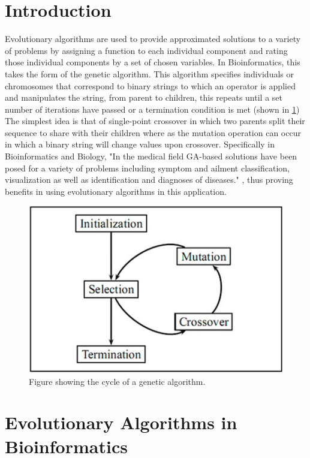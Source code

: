 \documentclass[12pt]{article}
\begin{document}
\section{Introduction}
\label{Introduction Section}
Evolutionary algorithms are used to provide approximated solutions to a variety of problems by assigning a function to each individual component and rating those individual components by a set of chosen variables. In Bioinformatics, this takes the form of the genetic algorithm. This algorithm specifies individuals or chromosomes that correspond to binary strings to which an operator is applied and manipulates the string, from parent to children, this repeats until a set number of iterations have passed or a termination condition is met (shown in \cref{fig:thing}) The simplest idea is that of single-point crossover in which two parents split their sequence to share with their children where as the mutation operation can occur in which a binary string will change values upon crossover. Specifically in Bioinformatics and Biology, "In the medical field GA-based solutions have been posed for a variety of problems including symptom and ailment classification, visualization as well as identification and diagnoses of diseases." \cite{Summary}, thus proving benefits in using evolutionary algorithms in this application. 

\begin{figure}[H]
    \centering
    \includegraphics[scale=0.6]{Media/Thing.png}
    \caption{Figure showing the cycle of a genetic algorithm.}
    \label{fig:thing}
\end{figure}
\section{Evolutionary Algorithms in Bioinformatics}
\label{Evolutionary Algorithms in Bioinformatics Section}
\end{document}
